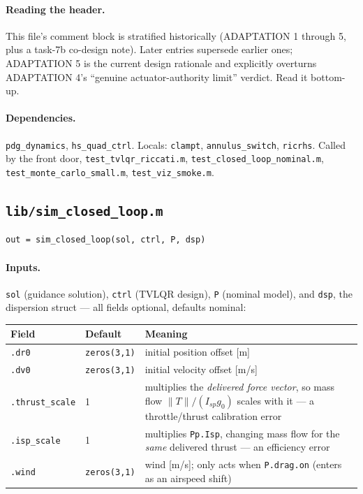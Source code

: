 \documentclass[11pt]{article}
\newcommand{\file}[1]{\texttt{#1}}
\begin{document}
\paragraph{Reading the header.} This file's comment block is stratified
historically (ADAPTATION 1 through 5, plus a task-7b co-design note). Later
entries supersede earlier ones; ADAPTATION 5 is the current design rationale
and explicitly overturns ADAPTATION 4's ``genuine actuator-authority limit''
verdict. Read it bottom-up.

\paragraph{Dependencies.} \texttt{pdg\_dynamics}, \texttt{hs\_quad\_ctrl}.
Locals: \texttt{clampt}, \texttt{annulus\_switch}, \texttt{ricrhs}. Called
by the front door, \file{test\_tvlqr\_riccati.m},
\file{test\_closed\_loop\_nominal.m}, \file{test\_monte\_carlo\_small.m},
\file{test\_viz\_smoke.m}.

\subsection{\texttt{lib/sim\_closed\_loop.m}}
\label{sec:mod:sim}

\begin{verbatim}
out = sim_closed_loop(sol, ctrl, P, dsp)
\end{verbatim}

\paragraph{Inputs.} \texttt{sol} (guidance solution), \texttt{ctrl} (TVLQR
design), \texttt{P} (nominal model), and \texttt{dsp}, the dispersion
struct --- all fields optional, defaults nominal:

\begin{center}
\begin{tabular}{@{}llL{7.6cm}@{}}
\toprule
Field & Default & Meaning \\
\midrule
\texttt{.dr0} & \texttt{zeros(3,1)} & initial position offset [m] \\
\texttt{.dv0} & \texttt{zeros(3,1)} & initial velocity offset [m/s] \\
\texttt{.thrust\_scale} & 1 & multiplies the \emph{delivered force vector},
  so mass flow $\lVert T\rVert/(I_{sp}g_0)$ scales with it --- a
  throttle/thrust calibration error \\
\texttt{.isp\_scale} & 1 & multiplies \texttt{Pp.Isp}, changing mass flow
  for the \emph{same} delivered thrust --- an efficiency error \\
\texttt{.wind} & \texttt{zeros(3,1)} & wind [m/s]; only acts when
  \texttt{P.drag.on} (enters as an airspeed shift) \\
\bottomrule
\end{tabular}
\end{center}
\end{document}
